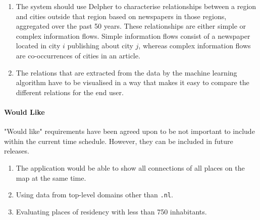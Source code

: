 \begin{enumerate}
    \item The system should use Delpher to characterise relationships between a region and cities outside that region based on newspapers in those regions, aggregated over the past 50 years. These relationships are either simple or complex information flows. Simple information flows consist of a newspaper located in city $i$ publishing about city $j$, whereas complex information flows are co-occurrences of cities in an article.
    \item The relations that are extracted from the data by the machine learning algorithm have to be visualised in a way that makes it easy to compare the different relations for the end user.
\end{enumerate}
\iffalse
\begin{enumerate}
    \item The application could be able to use international names.
    \item A front-end should be build for the UrbanSearch system. This front-end should visualise basic relations and statistics and can be used for presentations or educational purposes
    \item The software should use Delpher to characterise relationships between a region and cities outside that region based on newspapers in those regions, aggregated over the past 50 years. These relationships are either simple or complex information flows. Simple information flows consist of a newspaper located in city i publishing about city j, whereas complex information flows are co-occurrences of cities in an article.
    \item The relations that are extracted from the data by the machine learning algorithm and the relations provided by the CBS have to be visualised in a way that makes it easy to compare the different relations for the end user.
\end{enumerate}
\fi
\paragraph{Would Like}
"Would like" requirements have been agreed upon to be not important to include within the current time schedule. However, they can be included in future releases.

\begin{enumerate}
    \item The application would be able to show all connections of all places on the map at the same time.
    \item Using data from top-level domains other than \texttt{.nl}.
    \item Evaluating places of residency with less than 750 inhabitants.
\end{enumerate}

